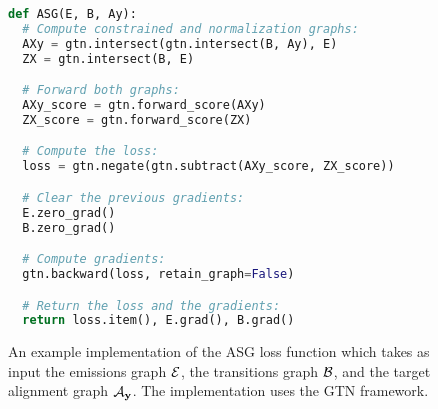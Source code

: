 \begin{figure}
\centering
\begin{lstlisting}[language=Python, frame=single,
    framesep=10pt,
    basicstyle=\ttfamily\small,
    keywordstyle=\bfseries\color{magenta!70!black},
    commentstyle=\bfseries\color{green!50!black},
    otherkeywords={True, False},
    xleftmargin=10pt,
    xrightmargin=10pt,
    ]
def ASG(E, B, Ay):
  # Compute constrained and normalization graphs:
  AXy = gtn.intersect(gtn.intersect(B, Ay), E)
  ZX = gtn.intersect(B, E)

  # Forward both graphs:
  AXy_score = gtn.forward_score(AXy)
  ZX_score = gtn.forward_score(ZX)

  # Compute the loss:
  loss = gtn.negate(gtn.subtract(AXy_score, ZX_score))

  # Clear the previous gradients:
  E.zero_grad()
  B.zero_grad()

  # Compute gradients:
  gtn.backward(loss, retain_graph=False)

  # Return the loss and the gradients:
  return loss.item(), E.grad(), B.grad()

\end{lstlisting}
\caption{An example implementation of the ASG loss function which takes as
    input the emissions graph $\mathcal{E}$, the transitions graph $\mathcal{B}$, and the target
    alignment graph $\mathcal{A}_{\bf y}$. The implementation uses the GTN framework.}
\label{fig:asg_gtn}
\end{figure}

